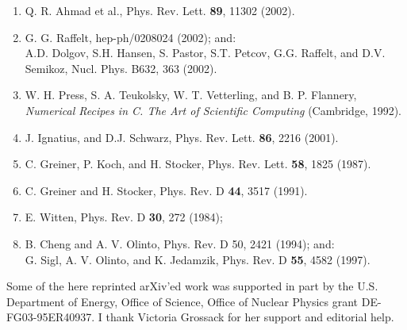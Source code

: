 \begin{mdframed}[linecolor=gray,roundcorner=12pt,backgroundcolor=Dandelion!15,linewidth=1pt,leftmargin=0cm,rightmargin=0cm,topline=true,bottomline=true,skipabove=12pt]
{\begin{enumerate}
\item %
 Q. R. Ahmad et al., Phys. Rev. Lett. \textbf{89}, 11302 (2002).
 
\item %
G. G. Raffelt, hep-ph/0208024 (2002); and: \\
A.D. Dolgov, S.H. Hansen, S. Pastor, S.T. Petcov, G.G. Raffelt, and
D.V. Semikoz, Nucl. Phys. B632, 363 (2002).

\item %
W. H. Press, S. A. Teukolsky, W. T. Vetterling, and B. P.
Flannery, \textit{Numerical Recipes in C. The Art of Scientific
Computing} (Cambridge, 1992).

\item %
J. Ignatius, and D.J. Schwarz, Phys. Rev. Lett. \textbf{86}, 2216
(2001).

\item %
C. Greiner, P. Koch, and H. Stocker, Phys. Rev. Lett.
\textbf{58}, 1825 (1987).

\item %
C. Greiner and H. Stocker, Phys. Rev. D \textbf{44}, 3517 (1991).

\item %
E. Witten, Phys. Rev. D \textbf{30}, 272 (1984);

\item %
 B. Cheng and A. V. Olinto, Phys. Rev. D 50, 2421 (1994); and:\\
 G. Sigl, A. V. Olinto, and K. Jedamzik, Phys. Rev. D \textbf{55}, 4582 (1997).

 
\end{enumerate}
}
\end{mdframed}
\vskip 0.5cm 

 Some of the here reprinted arXiv\rq ed work was  supported in part by the U.S. Department of Energy, Office of Science, Office of Nuclear Physics grant DE-FG03-95ER40937.  
I thank Victoria Grossack for her support and editorial help. 

